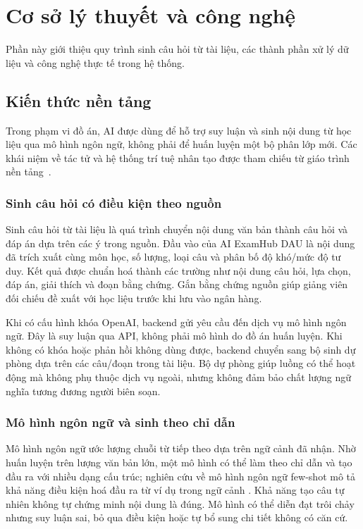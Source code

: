 \section{Cơ sở lý thuyết và công nghệ}
\label{sec:coso}

\begin{muctieu}
Phần này giới thiệu quy trình sinh câu hỏi từ tài liệu, các thành phần xử
lý dữ liệu và công nghệ thực tế trong hệ thống.
\end{muctieu}

\subsection{Kiến thức nền tảng}

Trong phạm vi đồ án, AI được dùng để hỗ trợ suy luận và sinh nội dung từ
học liệu qua mô hình ngôn ngữ, không phải để huấn luyện một bộ phân lớp mới.
Các khái niệm về tác tử và hệ thống trí tuệ nhân tạo được tham chiếu từ giáo
trình nền tảng~\cite{RussellNorvig2021}.

\subsubsection{Sinh câu hỏi có điều kiện theo nguồn}
Sinh câu hỏi từ tài liệu là quá trình chuyển nội dung văn bản thành câu hỏi
và đáp án dựa trên các ý trong nguồn. Đầu vào của AI ExamHub DAU là nội dung
đã trích xuất cùng môn học, số lượng, loại câu và phân bố độ khó/mức độ tư
duy. Kết quả được chuẩn hoá thành các trường như nội dung câu hỏi, lựa chọn,
đáp án, giải thích và đoạn bằng chứng. Gắn bằng chứng nguồn giúp giảng viên
đối chiếu đề xuất với học liệu trước khi lưu vào ngân hàng.

Khi có cấu hình khóa OpenAI, backend gửi yêu cầu đến dịch vụ mô hình ngôn
ngữ. Đây là suy luận qua API, không phải mô hình do đồ án huấn luyện. Khi
không có khóa hoặc phản hồi không dùng được, backend chuyển sang bộ sinh dự
phòng dựa trên các câu/đoạn trong tài liệu. Bộ dự phòng giúp luồng có thể
hoạt động mà không phụ thuộc dịch vụ ngoài, nhưng không đảm bảo chất lượng
ngữ nghĩa tương đương người biên soạn.

\subsubsection{Mô hình ngôn ngữ và sinh theo chỉ dẫn}
Mô hình ngôn ngữ ước lượng chuỗi từ tiếp theo dựa trên ngữ cảnh đã nhận.
Nhờ huấn luyện trên lượng văn bản lớn, một mô hình có thể làm theo chỉ dẫn
và tạo đầu ra với nhiều dạng cấu trúc; nghiên cứu về mô hình ngôn ngữ few-shot
mô tả khả năng điều kiện hoá đầu ra từ ví dụ trong ngữ cảnh
\cite{Brown2020}. Khả năng tạo câu tự nhiên không tự chứng minh nội dung là
đúng. Mô hình có thể diễn đạt trôi chảy nhưng suy luận sai, bỏ qua điều kiện
hoặc tự bổ sung chi tiết không có căn cứ.

